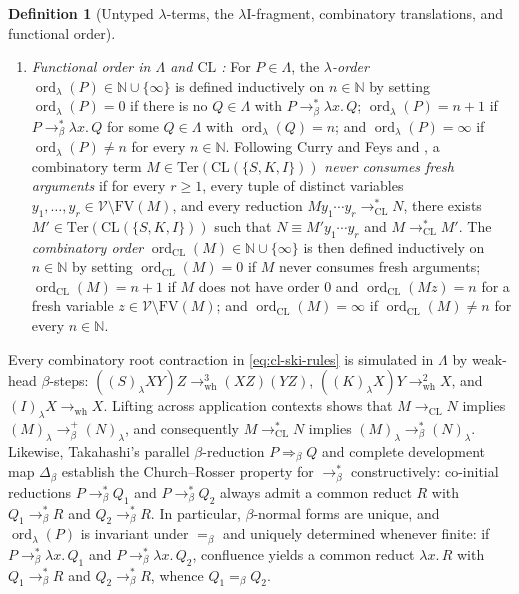 \documentclass[11pt,reqno]{amsart}
\numberwithin{equation}{section}
\theoremstyle{plain}
\theoremstyle{definition}
\newtheorem{definition}[theorem]{Definition}
\theoremstyle{remark}
\DeclareMathOperator{\ord}{ord}
\begin{document}
\begin{definition}[Untyped $\lambda$-terms, the $\lambda\mathrm{I}$-fragment, combinatory translations, and functional order]
\begin{enumerate}[label=(\roman*),leftmargin=2.2em]
  \item \emph{Functional order in $\Lambda$ and $\mathrm{CL}$ \cite[Definitions~35 and~37, pp.~98--99]{BarendregtEndrullisKlopWaldmann2017}:} For $P \in \Lambda$, the \emph{$\lambda$-order} $\ord_\lambda(P) \in \mathbb{N} \cup \{\infty\}$ is defined inductively on $n \in \mathbb{N}$ by setting $\ord_\lambda(P) = 0$ if there is no $Q \in \Lambda$ with $P \to_\beta^* \lambda x.\, Q$; $\ord_\lambda(P) = n + 1$ if $P \to_\beta^* \lambda x.\, Q$ for some $Q \in \Lambda$ with $\ord_\lambda(Q) = n$; and $\ord_\lambda(P) = \infty$ if $\ord_\lambda(P) \ne n$ for every $n \in \mathbb{N}$. Following Curry and Feys \cite{CurryFeys1958} and \cite[Definition~37]{BarendregtEndrullisKlopWaldmann2017}, a combinatory term $M \in \mathrm{Ter}(\mathrm{CL}(\{S, K, I\}))$ \emph{never consumes fresh arguments} if for every $r \ge 1$, every tuple of distinct variables $y_1, \dots, y_r \in \mathcal{V} \setminus \mathrm{FV}(M)$, and every reduction $M y_1 \cdots y_r \to_{\mathrm{CL}}^* N$, there exists $M' \in \mathrm{Ter}(\mathrm{CL}(\{S, K, I\}))$ such that $N \equiv M' y_1 \cdots y_r$ and $M \to_{\mathrm{CL}}^* M'$. The \emph{combinatory order} $\ord_{\mathrm{CL}}(M) \in \mathbb{N} \cup \{\infty\}$ is then defined inductively on $n \in \mathbb{N}$ by setting $\ord_{\mathrm{CL}}(M) = 0$ if $M$ never consumes fresh arguments; $\ord_{\mathrm{CL}}(M) = n + 1$ if $M$ does not have order $0$ and $\ord_{\mathrm{CL}}(M z) = n$ for a fresh variable $z \in \mathcal{V} \setminus \mathrm{FV}(M)$; and $\ord_{\mathrm{CL}}(M) = \infty$ if $\ord_{\mathrm{CL}}(M) \ne n$ for every $n \in \mathbb{N}$.
\end{enumerate}
\end{definition}

Every combinatory root contraction in \eqref{eq:cl-ski-rules} is simulated in $\Lambda$ by weak-head $\beta$-steps: $((S)_\lambda X Y) Z \to_{\mathrm{wh}}^3 (X Z)(Y Z)$, $((K)_\lambda X) Y \to_{\mathrm{wh}}^2 X$, and $(I)_\lambda X \to_{\mathrm{wh}} X$. Lifting across application contexts shows that $M \to_{\mathrm{CL}} N$ implies $(M)_\lambda \to_\beta^+ (N)_\lambda$, and consequently $M \to_{\mathrm{CL}}^* N$ implies $(M)_\lambda \to_\beta^* (N)_\lambda$. Likewise, Takahashi's parallel $\beta$-reduction $P \Rightarrow_\beta Q$ and complete development map $\Delta_\beta$ \cite{Takahashi1995} establish the Church--Rosser property for $\to_\beta^*$ constructively: co-initial reductions $P \to_\beta^* Q_1$ and $P \to_\beta^* Q_2$ always admit a common reduct $R$ with $Q_1 \to_\beta^* R$ and $Q_2 \to_\beta^* R$. In particular, $\beta$-normal forms are unique, and $\ord_\lambda(P)$ is invariant under $=_\beta$ and uniquely determined whenever finite: if $P \to_\beta^* \lambda x.\, Q_1$ and $P \to_\beta^* \lambda x.\, Q_2$, confluence yields a common reduct $\lambda x.\, R$ with $Q_1 \to_\beta^* R$ and $Q_2 \to_\beta^* R$, whence $Q_1 =_\beta Q_2$.
\end{document}
